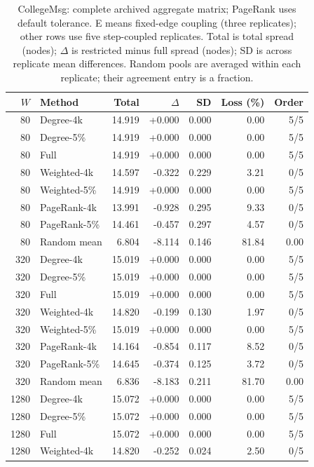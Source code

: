 \begin{table}[htbp]
\caption{CollegeMsg: complete archived aggregate matrix; PageRank uses default tolerance. E means fixed-edge coupling (three replicates); other rows use five step-coupled replicates. Total is total spread (nodes); $\Delta$ is restricted minus full spread (nodes); SD is across replicate mean differences. Random pools are averaged within each replicate; their agreement entry is a fraction.}\label{tab:s-college_msg}
\begin{tabular}{rlrrrrr}
\toprule
$W$ & Method & Total & $\Delta$ & SD & Loss (\%) & Order \\
\midrule
80 & Degree-4k & 14.919 & +0.000 & 0.000 & 0.00 & 5/5 \\
80 & Degree-5\% & 14.919 & +0.000 & 0.000 & 0.00 & 5/5 \\
80 & Full & 14.919 & +0.000 & 0.000 & 0.00 & 5/5 \\
80 & Weighted-4k & 14.597 & -0.322 & 0.229 & 3.21 & 0/5 \\
80 & Weighted-5\% & 14.919 & +0.000 & 0.000 & 0.00 & 5/5 \\
80 & PageRank-4k & 13.991 & -0.928 & 0.295 & 9.33 & 0/5 \\
80 & PageRank-5\% & 14.461 & -0.457 & 0.297 & 4.57 & 0/5 \\
80 & Random mean & 6.804 & -8.114 & 0.146 & 81.84 & 0.00 \\
320 & Degree-4k & 15.019 & +0.000 & 0.000 & 0.00 & 5/5 \\
320 & Degree-5\% & 15.019 & +0.000 & 0.000 & 0.00 & 5/5 \\
320 & Full & 15.019 & +0.000 & 0.000 & 0.00 & 5/5 \\
320 & Weighted-4k & 14.820 & -0.199 & 0.130 & 1.97 & 0/5 \\
320 & Weighted-5\% & 15.019 & +0.000 & 0.000 & 0.00 & 5/5 \\
320 & PageRank-4k & 14.164 & -0.854 & 0.117 & 8.52 & 0/5 \\
320 & PageRank-5\% & 14.645 & -0.374 & 0.125 & 3.72 & 0/5 \\
320 & Random mean & 6.836 & -8.183 & 0.211 & 81.70 & 0.00 \\
1280 & Degree-4k & 15.072 & +0.000 & 0.000 & 0.00 & 5/5 \\
1280 & Degree-5\% & 15.072 & +0.000 & 0.000 & 0.00 & 5/5 \\
1280 & Full & 15.072 & +0.000 & 0.000 & 0.00 & 5/5 \\
1280 & Weighted-4k & 14.820 & -0.252 & 0.024 & 2.50 & 0/5 \\

\end{tabular}
\end{table}
